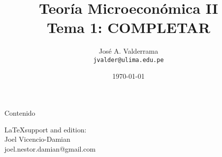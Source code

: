 \documentclass{beamer}
\title{Teoría Microeconómica II\\
		Tema 1: COMPLETAR}
\author[José A. Valderrama]{\large{José A. Valderrama}\\
		{\small \texttt{jvalder@ulima.edu.pe} {\color{black}{\faIcon{envelope}}}}}
\institute{\large Universidad de Lima - Carrera de Economía}
\date{\today}
\begin{document}
	\begin{frame}[plain]
		\maketitle
	\end{frame}
	\begin{frame}{Contenido}
		\tableofcontents
	\end{frame}

	
	
	
	
	
	
	
	

	\begin{frame}
		\maketitle
		{\small
			\LaTeX \enskip support and edition:\\
			Joel Vicencio-Damian\\
			\vspace{-0.05cm}
			joel.nestor.damian@gmail.com }
	\end{frame}

\end{document}
